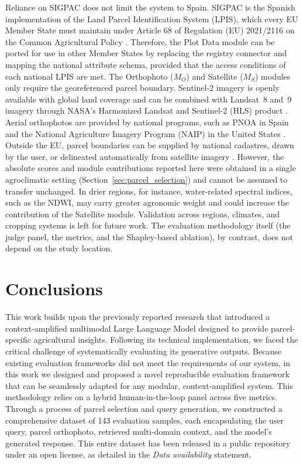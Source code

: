 \documentclass[preprint,review,12pt,authoryear]{elsarticle}
\begin{document}
Reliance on SIGPAC does not limit the system to Spain. SIGPAC is the Spanish implementation of the Land Parcel Identification System (LPIS), which every EU Member State must maintain under Article 68 of Regulation (EU) 2021/2116 on the Common Agricultural Policy \citep{eu_reg_2021_2116}. Therefore, the Plot Data module can be ported for use in other Member States by replacing the registry connector and mapping the national attribute schema, provided that the access conditions of each national LPIS are met. The Orthophoto ($M_O$) and Satellite ($M_S$) modules only require the georeferenced parcel boundary. Sentinel-2 imagery is openly available with global land coverage and can be combined with Landsat~8 and~9 imagery through NASA's Harmonized Landsat and Sentinel-2 (HLS) product \citep{claverie_hls_2018}. Aerial orthophotos are provided by national programs, such as PNOA in Spain \citep{ign_pnoa} and the National Agriculture Imagery Program (NAIP) in the United States \citep{usda_naip}. Outside the EU, parcel boundaries can be supplied by national cadastres, drawn by the user, or delineated automatically from satellite imagery \citep{kerner_ftw_2025}. However, the absolute scores and module contributions reported here were obtained in a single agroclimatic setting (Section~\ref{sec:parcel_selection}) and cannot be assumed to transfer unchanged. In drier regions, for instance, water-related spectral indices, such as the NDWI, may carry greater agronomic weight and could increase the contribution of the Satellite module. Validation across regions, climates, and cropping systems is left for future work. The evaluation methodology itself (the judge panel, the metrics, and the Shapley-based ablation), by contrast, does not depend on the study location.


\section{Conclusions}
\label{sec:Conclusions}

This work builds upon the previously reported research that introduced a context-amplified multimodal Large Language Model designed to provide parcel-specific agricultural insights. Following its technical implementation, we faced the critical challenge of systematically evaluating its generative outputs. Because existing evaluation frameworks did not meet the requirements of our system, in this work we designed and proposed a novel reproducible evaluation framework that can be seamlessly adapted for any modular, context-amplified system. This methodology relies on a hybrid human-in-the-loop panel across five metrics. Through a process of parcel selection and query generation, we constructed a comprehensive dataset of 143 evaluation samples, each encapsulating the user query, parcel orthophoto, retrieved multi-domain context, and the model's generated response. This entire dataset has been released in a public repository under an open license, as detailed in the \textit{Data availability} statement.
\end{document}

